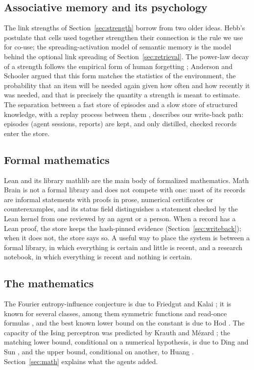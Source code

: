 \subsection{Associative memory and its psychology}
The link strengths of Section~\ref{sec:strength} borrow from two older ideas. Hebb's postulate \cite{Hebb1949} that cells used together strengthen their connection is the rule we use for co-use; the spreading-activation model of semantic memory \cite{CollinsLoftus1975} is the model behind the optional link spreading of Section~\ref{sec:retrieval}. The power-law decay of a strength follows the empirical form of human forgetting \cite{WixtedEbbesen1991,AndersonSchooler1991}; Anderson and Schooler argued that this form matches the statistics of the environment, the probability that an item will be needed again given how often and how recently it was needed, and that is precisely the quantity a strength is meant to estimate. The separation between a fast store of episodes and a slow store of structured knowledge, with a replay process between them \cite{McClellandMcNaughtonOReilly1995}, describes our write-back path: episodes (agent sessions, reports) are kept, and only distilled, checked records enter the store.

\subsection{Formal mathematics}
Lean \cite{deMouraUllrich2021} and its library mathlib \cite{mathlib2020} are the main body of formalized mathematics. Math Brain is not a formal library and does not compete with one: most of its records are informal statements with proofs in prose, numerical certificates or counterexamples, and its status field distinguishes a statement checked by the Lean kernel from one reviewed by an agent or a person. When a record has a Lean proof, the store keeps the hash-pinned evidence (Section~\ref{sec:writeback}); when it does not, the store says so. A useful way to place the system is between a formal library, in which everything is certain and little is recent, and a research notebook, in which everything is recent and nothing is certain.

\subsection{The mathematics}
The Fourier entropy-influence conjecture is due to Friedgut and Kalai \cite{FriedgutKalai1996}; it is known for several classes, among them symmetric functions and read-once formulas \cite{OWZ2011,OT2013}, and the best known lower bound on the constant is due to Hod \cite{Hod2017}. The capacity of the Ising perceptron was predicted by Krauth and M\'ezard \cite{KrauthMezard1989}; the matching lower bound, conditional on a numerical hypothesis, is due to Ding and Sun \cite{DingSun2019}, and the upper bound, conditional on another, to Huang \cite{Huang2024}. Section~\ref{sec:math} explains what the agents added.

